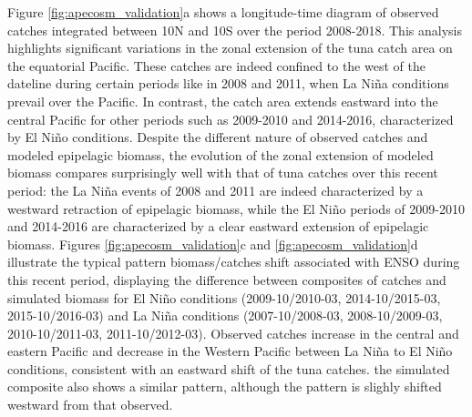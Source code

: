 Figure \ref{fig:apecosm_validation}a shows a longitude-time diagram of observed catches integrated between 10N and 10S over the period 2008-2018. This analysis highlights significant variations in the zonal extension of the tuna catch area on the equatorial Pacific. These catches are indeed confined to the west of the dateline during certain periods like in 2008 and 2011, when La Niña conditions prevail over the Pacific. In contrast, the catch area extends eastward into the central Pacific for other periods such as 2009-2010 and 2014-2016, characterized by El Niño conditions. Despite the different nature of observed catches and modeled epipelagic biomass, the evolution of the zonal extension of modeled biomass compares surprisingly well with that of tuna catches over this recent period: the La Niña events of 2008 and 2011 are indeed characterized by a westward retraction of epipelagic biomass, while the El Niño periods of 2009-2010 and 2014-2016 are characterized by a clear eastward extension of epipelagic biomass. Figures \ref{fig:apecosm_validation}c and \ref{fig:apecosm_validation}d illustrate the typical pattern biomass/catches shift associated with ENSO during this recent period, displaying the difference between composites of catches and simulated biomass for El Niño conditions (2009-10/2010-03, 2014-10/2015-03, 2015-10/2016-03) and La Niña conditions (2007-10/2008-03, 2008-10/2009-03, 2010-10/2011-03, 2011-10/2012-03). Observed catches increase in the central and eastern Pacific and decrease in the Western Pacific between La Niña to El Niño conditions, consistent with an eastward shift of the tuna catches. the simulated composite also shows a similar pattern, although the pattern is slighly shifted westward from that observed.

